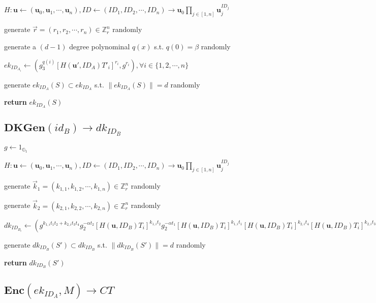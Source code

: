 \documentclass[a4paper]{article}
\begin{document}
$H: \bm{u} \gets (\bm{u}_0, \bm{u}_1, \cdots, \bm{u}_n), \textit{ID} \gets (\textit{ID}_1, \textit{ID}_2, \cdots, \textit{ID}_n) \rightarrow \bm{u}_0\prod\limits_{j \in [1, n]} \bm{u}_j^{\textit{ID}_j}$

generate $\vec{r} = (r_1, r_2, \cdots, r_n) \in \mathbb{Z}_r^n$ randomly

generate a $(d - 1)$ degree polynominal $q(x)$ s.t. $q(0) = \beta$ randomly

$\textit{ek}_{\textit{ID}_{A_i}} \gets (g_3^{q(i)} [H(\bm{u}', \textit{ID}_A)T'_i]^{r_i}, g^{r_i}), \forall i \in \{1, 2, \cdots, n\}$

generate $\textit{ek}_{\textit{ID}_A}(S) \subset \textit{ek}_{\textit{ID}_A}$ s.t. $\|\textit{ek}_{\textit{ID}_A}(S)\| = d$ randomly

\textbf{return} $\textit{ek}_{\textit{ID}_A}(S)$

\subsection{$\textbf{DKGen}(\textit{id}_B) \rightarrow \textit{dk}_{\textit{ID}_B}$}

$g \gets 1_{\mathbb{G}_1}$

$H: \bm{u} \gets (\bm{u}_0, \bm{u}_1, \cdots, \bm{u}_n), \textit{ID} \gets (\textit{ID}_1, \textit{ID}_2, \cdots, \textit{ID}_n) \rightarrow \bm{u}_0\prod\limits_{j \in [1, n]} \bm{u}_j^{\textit{ID}_j}$

generate $\vec{k}_1 = (k_{1, 1}, k_{1, 2}, \cdots, k_{1, n}) \in \mathbb{Z}_r^n$ randomly

generate $\vec{k}_2 = (k_{2, 1}, k_{2, 2}, \cdots, k_{2, n}) \in \mathbb{Z}_r^n$ randomly

$\textit{dk}_{\textit{ID}_{B_i}} \gets (
g^{k_{1, i} t_1 t_2 + k_{2, i} t_3 t_4}
g_2^{-\alpha t_2} [H(\bm{u}, \textit{ID}_B) T_i]^{k_{1, i} t_2}
g_2^{-\alpha t_1} [H(\bm{u}, \textit{ID}_B) T_i]^{k_{1, i} t_1}
[H(\bm{u}, \textit{ID}_B) T_i]^{k_{2, i} t_4}
[H(\bm{u}, \textit{ID}_B) T_i]^{k_{2, i} t_3}
), \forall i \in \{1, 2, \cdots, n\}
$

generate $\textit{dk}_{\textit{ID}_B}(S') \subset \textit{dk}_{\textit{ID}_B}$ s.t. $\|\textit{dk}_{\textit{ID}_B}(S')\| = d$ randomly

\textbf{return} $\textit{dk}_{\textit{ID}_B}(S')$

\subsection{$\textbf{Enc}(\textit{ek}_{\textit{ID}_A}, M) \rightarrow \textit{CT}$}
\end{document}
